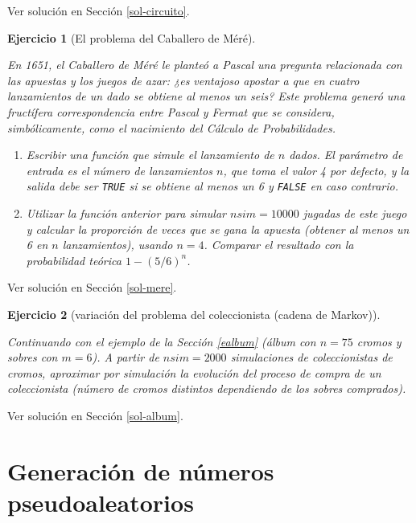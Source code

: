 \documentclass[
  spanish,
  10pt,
]{book}
\theoremstyle{break}
\newtheorem{exercise}{Ejercicio}[chapter]
\theoremstyle{nonumberplain}
\begin{document}
Ver solución en Sección \ref{sol-circuito}.

\begin{exercise}[El problema del Caballero de Méré]
\protect\hypertarget{exr:mere}{}\label{exr:mere}

En 1651, el Caballero de Méré le planteó a Pascal una pregunta
relacionada con las apuestas y los juegos de azar: ¿es ventajoso
apostar a que en cuatro lanzamientos de un dado se obtiene al menos
un seis? Este problema generó una fructífera correspondencia entre
Pascal y Fermat que se considera, simbólicamente, como el nacimiento
del Cálculo de Probabilidades.

\begin{enumerate}
\def\labelenumi{\alph{enumi})}
\item
  Escribir una función que simule el lanzamiento de \(n\) dados. El
  parámetro de entrada es el número de lanzamientos \(n\), que toma
  el valor 4 por defecto, y la salida debe ser \texttt{TRUE} si se
  obtiene al menos un 6 y \texttt{FALSE} en caso contrario.
\item
  Utilizar la función anterior para simular \(nsim=10000\) jugadas
  de este juego y calcular la proporción de veces que se gana la
  apuesta (obtener al menos un 6 en \(n\) lanzamientos), usando
  \(n=4\). Comparar el resultado con la probabilidad teórica
  \(1-(5/6)^{n}\).
\end{enumerate}

\end{exercise}

Ver solución en Sección \ref{sol-mere}.

\begin{exercise}[variación del problema del coleccionista (cadena de Markov)]
\protect\hypertarget{exr:album}{}\label{exr:album}

Continuando con el ejemplo de la Sección \ref{ealbum}
(álbum con \(n = 75\) cromos y sobres con \(m = 6\)). A partir de \(nsim=2000\) simulaciones de coleccionistas de cromos, aproximar por simulación la evolución del proceso de compra de un coleccionista (número de cromos distintos dependiendo de los sobres comprados).
\end{exercise}

Ver solución en Sección \ref{sol-album}.

\chapter{Generación de números pseudoaleatorios}\label{gen-pseudo}
\end{document}
